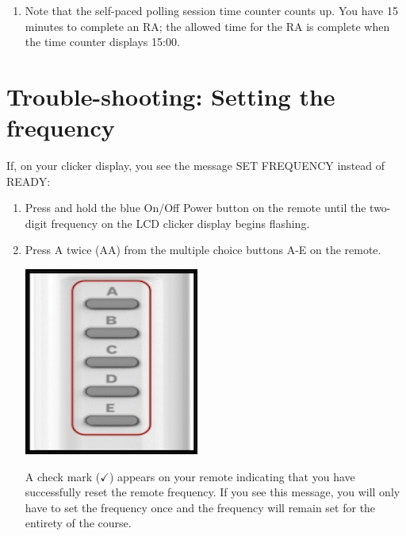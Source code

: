 \documentclass[12pt]{article}
\begin{document}
\begin{enumerate}
\item Note that the self-paced polling session time counter counts up.  You have 15 minutes to complete an RA; the allowed time for the RA is complete when the time counter displays 15:00.

\end{enumerate}

\section{Trouble-shooting: Setting the frequency}

If, on your clicker display, you see the message SET FREQUENCY instead of READY:
\begin{enumerate}
\item Press and hold the blue On/Off Power button on the remote until the two-digit frequency on the LCD clicker display begins flashing.
\item Press A twice (AA) from the multiple choice buttons A-E on the remote.

\begin{center}
\includegraphics{clicker_images/buttons.png}
\end{center}

A check mark ($\checkmark$) appears on your remote indicating that you have successfully reset the remote frequency.  If you see this message, you will only have to set the frequency once and the frequency will remain set for the entirety of the course.
\end{enumerate}
\end{document}
